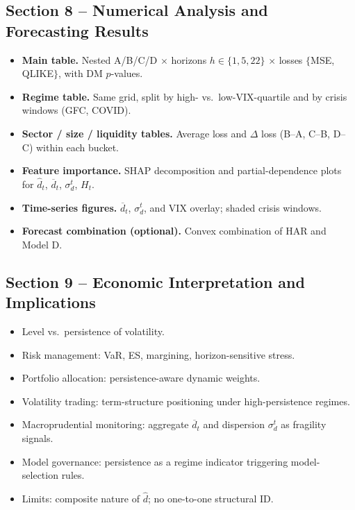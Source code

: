 \documentclass[11pt,a4paper]{article}
\begin{document}
\subsection{Section 8 -- Numerical Analysis and Forecasting Results}\label{sec:paper-8}
\begin{itemize}
  \item \textbf{Main table.} Nested A/B/C/D $\times$ horizons
  $h\in\{1,5,22\}$ $\times$ losses $\{$MSE, QLIKE$\}$, with DM $p$-values.
  \item \textbf{Regime table.} Same grid, split by high- vs.\
  low-VIX-quartile and by crisis windows (GFC, COVID).
  \item \textbf{Sector / size / liquidity tables.} Average loss and
  $\Delta$ loss (B--A, C--B, D--C) within each bucket.
  \item \textbf{Feature importance.} SHAP decomposition and
  partial-dependence plots for $\hat d_t$, $\overline{d}_t$, $\sigma_d^t$,
  $H_t$.
  \item \textbf{Time-series figures.} $\overline{d}_t$, $\sigma_d^t$, and
  VIX overlay; shaded crisis windows.
  \item \textbf{Forecast combination (optional).} Convex combination of
  HAR and Model D.
\end{itemize}

\subsection{Section 9 -- Economic Interpretation and Implications}
\begin{itemize}
  \item Level vs.\ persistence of volatility.
  \item Risk management: VaR, ES, margining, horizon-sensitive stress.
  \item Portfolio allocation: persistence-aware dynamic weights.
  \item Volatility trading: term-structure positioning under
  high-persistence regimes.
  \item Macroprudential monitoring: aggregate $\overline{d}_t$ and
  dispersion $\sigma_d^t$ as fragility signals.
  \item Model governance: persistence as a regime indicator triggering
  model-selection rules.
  \item Limits: composite nature of $\hat d$; no one-to-one structural ID.
\end{itemize}
\end{document}
